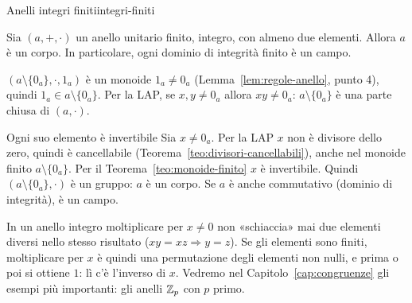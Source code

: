\begin{concetto}
\begin{Teorema}{Anelli integri finiti}{integri-finiti}
    \begin{prerequisiti}
    \end{prerequisiti}
    Sia $(a, +, \cdot)$ un anello unitario finito, integro, con almeno due elementi. Allora $a$ è un corpo.
    In particolare, ogni dominio di integrità finito è un campo.
\end{Teorema}
\begin{dimostrazione}
    \begin{caso}{$(a \setminus \{0_a\}, \cdot, 1_a)$ è un monoide}
        $1_a \neq 0_a$ (Lemma~\ref{lem:regole-anello}, punto 4), quindi $1_a \in a \setminus \{0_a\}$. Per la LAP, se $x, y \neq 0_a$ allora $xy \neq 0_a$:
        $a \setminus \{0_a\}$ è una parte chiusa di $(a, \cdot)$.
    \end{caso}
    \begin{caso}{Ogni suo elemento è invertibile}
        Sia $x \neq 0_a$. Per la LAP $x$ non è divisore dello zero, quindi è cancellabile (Teorema~\ref{teo:divisori-cancellabili}), anche nel
        monoide finito $a \setminus \{0_a\}$. Per il Teorema~\ref{teo:monoide-finito} $x$ è invertibile. Quindi $(a \setminus \{0_a\}, \cdot)$ è un gruppo:
        $a$ è un corpo. Se $a$ è anche commutativo (dominio di integrità), è un campo.
    \end{caso}
\end{dimostrazione}
\end{concetto}

\begin{spiegazione}
    In un anello integro moltiplicare per $x \neq 0$ non «schiaccia» mai due elementi diversi nello stesso risultato
    ($xy = xz \Rightarrow y = z$). Se gli elementi sono finiti, moltiplicare per $x$ è quindi una permutazione degli elementi non nulli,
    e prima o poi si ottiene $1$: lì c'è l'inverso di $x$. Vedremo nel Capitolo~\ref{cap:congruenze} gli esempi più importanti:
    gli anelli $\mathbb{Z}_p$ con $p$ primo.
\end{spiegazione}
